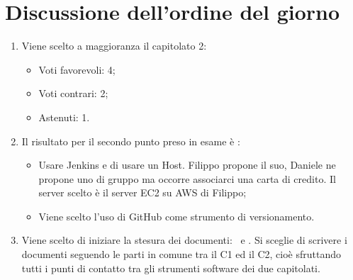 \documentclass[../verbale-2016-12-07.tex]{subfiles}
\begin{document}
	\section{Discussione dell'ordine del giorno}
	\begin{enumerate}
		\item Viene scelto a maggioranza il capitolato 2:
			\begin{itemize}
				\item Voti favorevoli: 4;
				\item Voti contrari: 2;
				\item Astenuti: 1.
			\end{itemize}
		\item Il risultato per il secondo punto preso in esame è :
			\begin{itemize}
				\item Usare Jenkins e di usare un Host. Filippo propone il suo, Daniele ne propone uno di gruppo ma occorre associarci una carta di credito. Il server scelto è il server EC2 su AWS di Filippo;
				\item Viene scelto l’uso di GitHub come strumento di versionamento.
			\end{itemize}
		\item Viene scelto di iniziare la stesura dei documenti: \normediprogetto\ e \pianodiqualifica. Si sceglie di scrivere i documenti seguendo le parti in comune tra il C1 ed il C2, cioè sfruttando tutti i punti di contatto tra gli strumenti software dei due capitolati.
	\end{enumerate}
\end{document}
